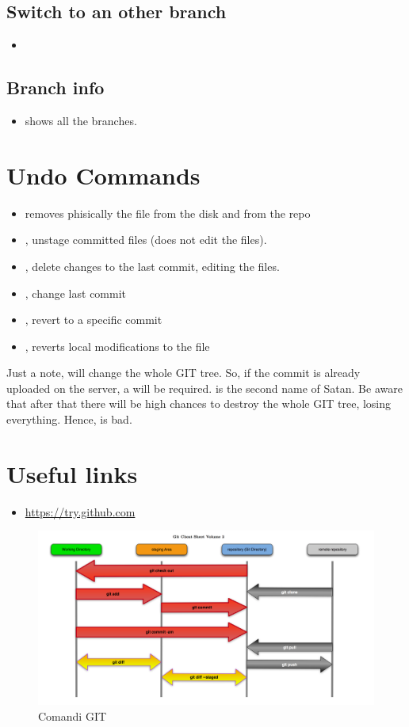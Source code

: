 \subsection{Switch to an other branch}
\begin{itemize}
\item {}
\end{itemize}

\subsection{Branch info}
\begin{itemize}
	\item {} shows all the branches.
\end{itemize}

\section{Undo Commands}
\begin{itemize}
\item {} removes phisically the file from the disk and from the repo
\item {}, unstage committed files (does not edit the files).
\item {}, delete changes to the last commit, editing the files.
\item {}, change last commit
\item {}, revert to a specific commit
\item {}, reverts local modifications to the file
\end{itemize}

Just a note,  will change the whole GIT tree. So, 
if the commit is already uploaded on  the server, a  will be
required.   is the second name of Satan. Be aware that
after that there will be high chances to destroy the whole GIT tree, losing
everything. Hence,  is bad.

\section{Useful links}
\begin{itemize}
\item \url{https://try.github.com}
\end{itemize}

\begin{figure}[h]
	\centering
	\includegraphics[width=\textwidth]{gfx/git_graph}
	
	\caption{Comandi GIT}
	\label{Fig:Commands}
\end{figure}
